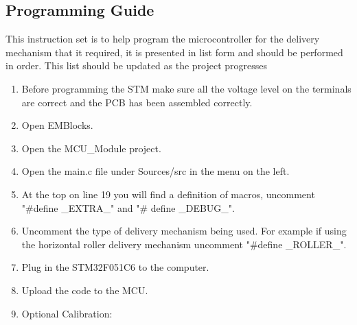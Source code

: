 \documentclass[a4paper,11pt]{article}
\numberwithin{figure}{section}
\numberwithin{table}{section}
\begin{document}
\begin{appendices}
\subsection{Programming Guide}
\label{subsec:progamming}
This instruction set is to help program the microcontroller for the delivery mechanism that it required, it is presented in list form and should be performed in order. This list should be updated as the project progresses
\begin{enumerate}
  \item Before programming the STM make sure all the voltage level on the terminals are correct and the PCB has been assembled correctly.
  \item Open EMBlocks.
  \item Open the MCU\_Module project.
  \item Open the main.c file under Sources/src in the menu on the left.
  \item At the top on line 19 you will find a definition of macros, uncomment "\#define \_EXTRA\_" and "\# define \_DEBUG\_".
  \item Uncomment the type of delivery mechanism being used. For example if using the horizontal roller delivery mechanism uncomment "\#define \_ROLLER\_".
  \item Plug in the STM32F051C6 to the computer.
  \item Upload the code to the MCU.
  \item Optional Calibration: {
  \begin{enumerate}
 

\end{enumerate}}
\end{enumerate}
\end{appendices}
\end{document}

